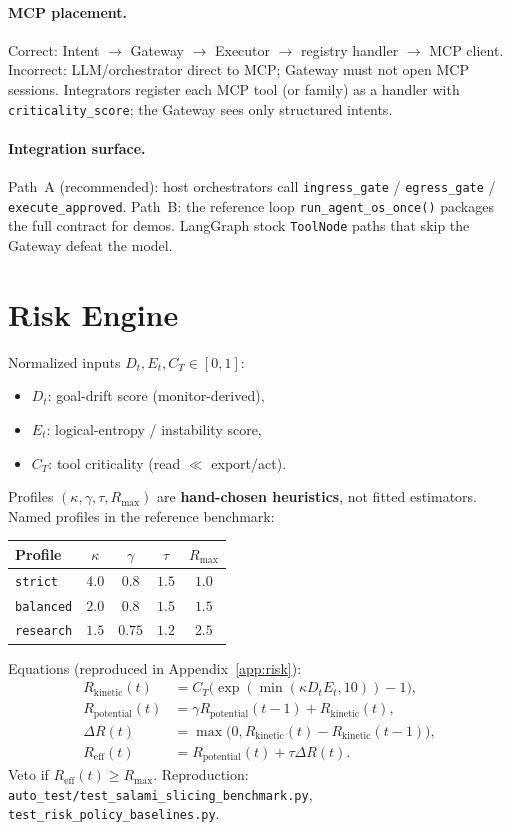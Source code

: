 \documentclass{article}
\begin{document}
\paragraph{MCP placement.}
Correct: Intent $\rightarrow$ Gateway $\rightarrow$ Executor $\rightarrow$
registry handler $\rightarrow$ MCP client. Incorrect: LLM/orchestrator
direct to MCP; Gateway must not open MCP sessions. Integrators register each
MCP tool (or family) as a handler with \texttt{criticality\_score}; the
Gateway sees only structured intents.

\paragraph{Integration surface.}
Path~A (recommended): host orchestrators call \texttt{ingress\_gate} /
\texttt{egress\_gate} / \texttt{execute\_approved}. Path~B: the reference
loop \texttt{run\_agent\_os\_once()} packages the full contract for demos.
LangGraph stock \texttt{ToolNode} paths that skip the Gateway defeat the
model.

\section{Risk Engine}
\label{sec:risk}

Normalized inputs $D_t,E_t,C_T \in [0,1]$:
\begin{itemize}
  \item $D_t$: goal-drift score (monitor-derived),
  \item $E_t$: logical-entropy / instability score,
  \item $C_T$: tool criticality (read $\ll$ export/act).
\end{itemize}
Profiles $(\kappa,\gamma,\tau,R_{\max})$ are \textbf{hand-chosen heuristics},
not fitted estimators. Named profiles in the reference benchmark:
\begin{center}
\small
\begin{tabular}{lcccc}
\toprule
Profile & $\kappa$ & $\gamma$ & $\tau$ & $R_{\max}$ \\
\midrule
\texttt{strict} & $4.0$ & $0.8$ & $1.5$ & $1.0$ \\
\texttt{balanced} & $2.0$ & $0.8$ & $1.5$ & $1.5$ \\
\texttt{research} & $1.5$ & $0.75$ & $1.2$ & $2.5$ \\
\bottomrule
\end{tabular}
\end{center}
Equations (reproduced in Appendix~\ref{app:risk}):
\[
\begin{aligned}
R_{\mathrm{kinetic}}(t)
  &= C_T\bigl(\exp(\min(\kappa D_t E_t,10))-1\bigr),\\
R_{\mathrm{potential}}(t)
  &= \gamma R_{\mathrm{potential}}(t-1) + R_{\mathrm{kinetic}}(t),\\
\Delta R(t)
  &= \max\bigl(0, R_{\mathrm{kinetic}}(t)-R_{\mathrm{kinetic}}(t-1)\bigr),\\
R_{\mathrm{eff}}(t)
  &= R_{\mathrm{potential}}(t) + \tau\Delta R(t).
\end{aligned}
\]
Veto if $R_{\mathrm{eff}}(t)\ge R_{\max}$. Reproduction:
\texttt{auto\_test/test\_salami\_slicing\_benchmark.py},
\texttt{test\_risk\_policy\_baselines.py}.
\end{document}
